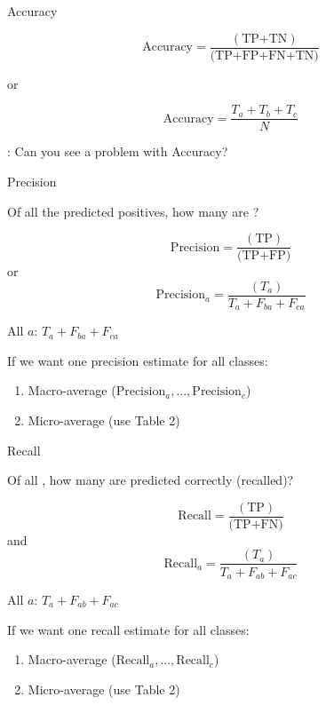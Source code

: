 \documentclass[10pt]{beamer}
\begin{document}
\begin{frame}{Accuracy}


\[
\text{Accuracy} = \frac{(\text{TP+TN})}{\text{(TP+FP+FN+TN)}}
\]

or

\[
\text{Accuracy} = \frac{T_a + T_b + T_c}{N}
\]

\pause


: Can you see a problem with Accuracy?

\end{frame}

\begin{frame}{Precision}

Of all the predicted positives, how many are ?

\[
\text{Precision} = \frac{(\text{TP})}{\text{(TP+FP)}}
\]
or
\[
\text{Precision}_a = \frac{(T_a)}{T_a + F_{ba} + F_{ca}}
\]

All  $a$: $T_a + F_{ba} + F_{ca}$

If we want one precision estimate for all classes:
\begin{enumerate}
\item Macro-average ($\text{Precision}_a, ..., \text{Precision}_c$)
\item Micro-average (use Table 2)
\end{enumerate}

\end{frame}



\begin{frame}{Recall}

Of all , how many are predicted correctly (recalled)?\pause

\[
\text{Recall} = \frac{(\text{TP})}{\text{(TP+FN)}}
\]
and
\[
\text{Recall}_a =  \frac{(T_a)}{T_a + F_{ab} + F_{ac}}
\]

All  $a$: $T_a + F_{ab} + F_{ac}$

If we want one recall estimate for all classes:
\begin{enumerate}
\item Macro-average ($\text{Recall}_a, ..., \text{Recall}_c$)
\item Micro-average (use Table 2)
\end{enumerate}



\end{frame}
\end{document}
